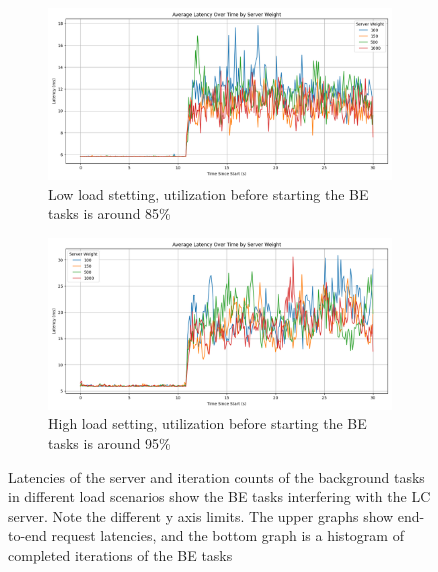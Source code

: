 \begin{figure}[t]
    \centering
    \begin{subfigure}{\columnwidth}
        \includegraphics[width=\columnwidth]{graphs/srv-bg-weight-cmp-low.png}
        \caption{Low load stetting, utilization before starting the BE tasks is
        around 85\%}\label{fig:srv-bg-weight-cmp-low}
        \vspace{12pt}
    \end{subfigure}
    \hspace{\fill}
    \begin{subfigure}{\columnwidth}
        \includegraphics[width=\columnwidth]{graphs/srv-bg-weight-cmp-high.png}
        \caption{High load setting, utilization before starting the BE tasks is
        around 95\%}\label{fig:srv-bg-weight-cmp-high}
    \end{subfigure}
    \vspace{4pt}
    \caption{Latencies of the server and iteration counts of the background
    tasks in different load scenarios show the BE tasks interfering with the LC
    server. Note the different y axis limits. The upper graphs show end-to-end
    request latencies, and the bottom graph is a histogram of completed
    iterations of the BE tasks}\label{fig:srv-bg-weight-cmp}
\end{figure}

